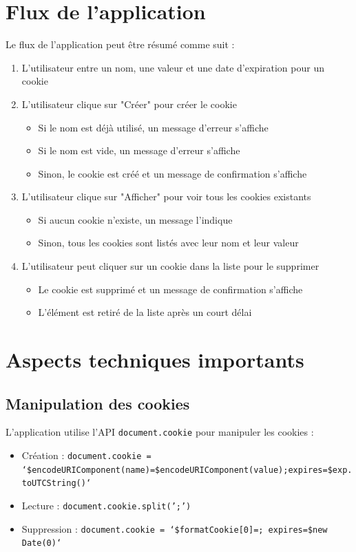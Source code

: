 \documentclass{article}
\begin{document}
\section{Flux de l'application}
Le flux de l'application peut être résumé comme suit :

\begin{enumerate}
    \item L'utilisateur entre un nom, une valeur et une date d'expiration pour un cookie
    \item L'utilisateur clique sur "Créer" pour créer le cookie
    \begin{itemize}
        \item Si le nom est déjà utilisé, un message d'erreur s'affiche
        \item Si le nom est vide, un message d'erreur s'affiche
        \item Sinon, le cookie est créé et un message de confirmation s'affiche
    \end{itemize}
    \item L'utilisateur clique sur "Afficher" pour voir tous les cookies existants
    \begin{itemize}
        \item Si aucun cookie n'existe, un message l'indique
        \item Sinon, tous les cookies sont listés avec leur nom et leur valeur
    \end{itemize}
    \item L'utilisateur peut cliquer sur un cookie dans la liste pour le supprimer
    \begin{itemize}
        \item Le cookie est supprimé et un message de confirmation s'affiche
        \item L'élément est retiré de la liste après un court délai
    \end{itemize}
\end{enumerate}

\section{Aspects techniques importants}

\subsection{Manipulation des cookies}
L'application utilise l'API \texttt{document.cookie} pour manipuler les cookies :
\begin{itemize}
    \item Création : \texttt{document.cookie = `\${encodeURIComponent(name)}=\${encodeURIComponent(value)};expires=\${exp.toUTCString()}`}
    \item Lecture : \texttt{document.cookie.split(';')}
    \item Suppression : \texttt{document.cookie = `\${formatCookie[0]}=; expires=\${new Date(0)}`}
\end{itemize}
\end{document}
